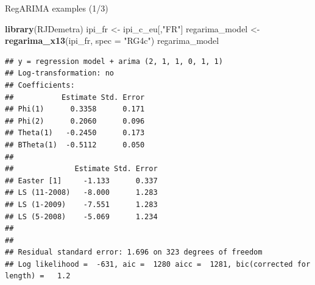 \documentclass[10pt,xcolor=table,color={dvipsnames,usenames},ignorenonframetext,usepdftitle=false,french]{beamer}
\newenvironment{Shaded}{\begin{snugshade}}{\end{snugshade}}
\newcommand{\DataTypeTok}[1]{\textcolor[rgb]{0.13,0.29,0.53}{#1}}
\newcommand{\KeywordTok}[1]{\textcolor[rgb]{0.13,0.29,0.53}{\textbf{#1}}}
\newcommand{\NormalTok}[1]{#1}
\newcommand{\StringTok}[1]{\textcolor[rgb]{0.31,0.60,0.02}{#1}}
\begin{document}
\begin{frame}[fragile]{RegARIMA examples (1/3)}
\protect\hypertarget{regarima-examples-13}{}

\begin{Shaded}
\begin{Highlighting}[]
\KeywordTok{library}\NormalTok{(RJDemetra)}
\NormalTok{ipi_fr <-}\StringTok{ }\NormalTok{ipi_c_eu[,}\StringTok{"FR"}\NormalTok{]}
\NormalTok{regarima_model <-}\StringTok{ }\KeywordTok{regarima_x13}\NormalTok{(ipi_fr, }\DataTypeTok{spec =} \StringTok{"RG4c"}\NormalTok{)}
\NormalTok{regarima_model}
\end{Highlighting}
\end{Shaded}

\begin{verbatim}
## y = regression model + arima (2, 1, 1, 0, 1, 1)
## Log-transformation: no
## Coefficients:
##           Estimate Std. Error
## Phi(1)      0.3358      0.171
## Phi(2)      0.2060      0.096
## Theta(1)   -0.2450      0.173
## BTheta(1)  -0.5112      0.050
## 
##              Estimate Std. Error
## Easter [1]     -1.133      0.337
## LS (11-2008)   -8.000      1.283
## LS (1-2009)    -7.551      1.283
## LS (5-2008)    -5.069      1.234
## 
## 
## Residual standard error: 1.696 on 323 degrees of freedom
## Log likelihood =  -631, aic =  1280 aicc =  1281, bic(corrected for length) =   1.2
\end{verbatim}

\end{frame}
\end{document}
